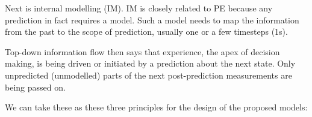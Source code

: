 \documentclass[11pt]{llncs}
\begin{document}

Next is internal modelling (IM). IM is closely related to PE because
any prediction in fact requires a model. Such a model needs to map the
information from the past to the scope of prediction, usually one or a
few timesteps (1s).

Top-down information flow then says that experience, the apex of
decision making, is being driven or initiated by a prediction about
the next state. Only unpredicted (unmodelled) parts of the next
post-prediction measurements are being passed on.


We can take these as these three principles for the design of the
proposed models:
\end{document}
